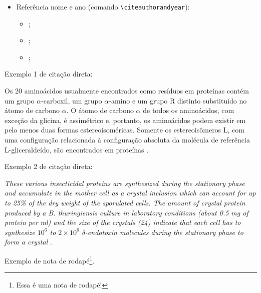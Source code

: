 \documentclass[
	article,
	11pt,
	oneside,
	a4paper,
	chapter=TITLE,
	section=TITLE,
	english,
	brazil,
	sumario=tradicional
]{abntex2}
\begin{document}
\begin{itemize}
     	\begin{itemize}
     		\item \cite{Abedi2014, Agaisse1995};
             \item \cite{AgapitoTenfen2014, BtNomenclature2016, Nelson2014};
     	\end{itemize}
     	\item Referência nome e ano (comando \verb|\citeauthorandyear|):
     	\begin{itemize}
     		\item {};
     		\item {};
     		\item {};
     	\end{itemize}
     \end{itemize}
     
     
     Exemplo 1 de citação direta:
     
     \begin{citacao}
     	Os 20 aminoácidos usualmente encontrados como resíduos em proteínas contém um grupo $\alpha$-carboxil, um grupo $\alpha$-amino e um grupo R distinto substituído no átomo de carbono $\alpha$. O átomo de carbono $\alpha$ de todos os aminoácidos, com exceção da glicina, é assimétrico e, portanto, os aminoácidos podem existir em pelo menos duas formas estereoisoméricas. Somente os estereoisômeros L, com uma configuração relacionada à configuração absoluta da molécula de referência L-gliceraldeído, são encontrados em proteínas \cite[p. 81]{Nelson2014}.
     \end{citacao}
     
     Exemplo 2 de citação direta:
     
     \begin{citacao}
     	\textit{These various insecticidal proteins are synthesized during the stationary phase and accumulate in the mother cell as a crystal inclusion which can account for up to 25\% of the dry weight of the sporulated cells. The amount of crystal protein produced by a B. thuringiensis culture in laboratory conditions (about 0.5 mg of protein per ml) and the size of the crystals (24) indicate that each cell has to synthesize $10^6$ to $2 \times 10^6$ $\delta$-endotoxin molecules during the stationary phase to form a crystal} \cite[p. 1]{Agaisse1995}.
     \end{citacao}
     
     Exemplo de nota de rodapé\footnote{Essa é uma nota de rodapé!}.
     
\end{document}
